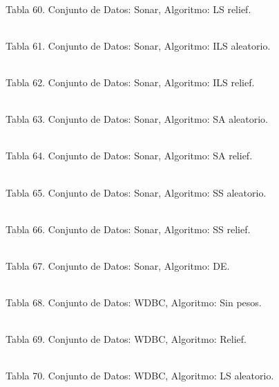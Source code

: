 \documentclass{ci5652}
\begin{document}
%
\\
Tabla 60. Conjunto de Datos: Sonar, Algoritmo: LS relief.

%
\\
Tabla 61. Conjunto de Datos: Sonar, Algoritmo: ILS aleatorio.

%
\\
Tabla 62. Conjunto de Datos: Sonar, Algoritmo: ILS relief.

%
\\
Tabla 63. Conjunto de Datos: Sonar, Algoritmo: SA aleatorio.

%
\\
Tabla 64. Conjunto de Datos: Sonar, Algoritmo: SA relief.

%
\\
Tabla 65. Conjunto de Datos: Sonar, Algoritmo: SS aleatorio.

%
\\
Tabla 66. Conjunto de Datos: Sonar, Algoritmo: SS relief.

%
\\
Tabla 67. Conjunto de Datos: Sonar, Algoritmo: DE.

%
\\
Tabla 68. Conjunto de Datos: WDBC, Algoritmo: Sin pesos.

%
\\
Tabla 69. Conjunto de Datos: WDBC, Algoritmo: Relief.

%
\\
Tabla 70. Conjunto de Datos: WDBC, Algoritmo: LS aleatorio.
\end{document}
